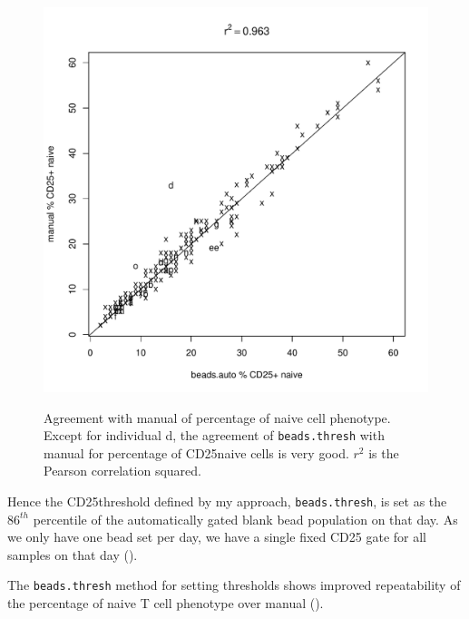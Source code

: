 \begin{figure}
\begin{minipage}{.6\textwidth}
\includegraphics[width=\linewidth]{figures/naive-cd25pos-beads-manual-agreement.pdf}
\end{minipage}
{ Agreement with manual of percentage of \positive naive cell phenotype. }
{
  Except for individual d, the agreement of \texttt{beads.thresh} with manual for percentage of CD25\positive naive cells
  is very good.  $r^2$ is the Pearson correlation squared.
}
\end{figure}

Hence the CD25\positive threshold defined by my approach, \texttt{beads.thresh}, is set as the $86^{th}$ percentile of the automatically gated blank bead population on that day.
As we only have one bead set per day, we have a single fixed CD25 gate for all samples on that day ().

The \texttt{beads.thresh} method for setting  thresholds  shows improved repeatability of the percentage of \positive naive T cell phenotype
over manual ().  

